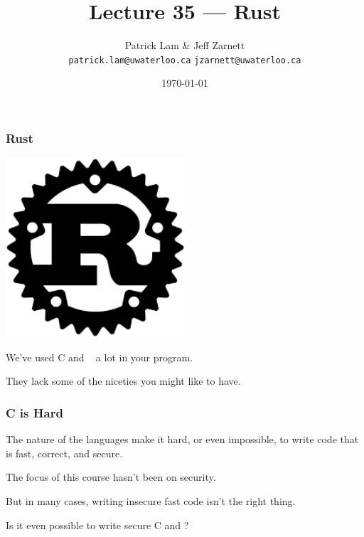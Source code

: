 

\title{Lecture 35 --- Rust }

\author{Patrick Lam \& Jeff Zarnett \\ \small \texttt{patrick.lam@uwaterloo.ca} \texttt{jzarnett@uwaterloo.ca}}
\date{\today}




\begin{frame}
  \titlepage

 \end{frame}




\begin{frame}
\frametitle{Rust}

\begin{center}
	\includegraphics[width=0.5\textwidth]{images/Rust.png}
\end{center}

We've used C and \CPP~ a lot in your program.

They lack some of the niceties you might like to have.

\end{frame}


\begin{frame}
\frametitle{C is Hard}

The nature of the languages make it hard, or even impossible, to write code that is fast, correct, and secure. 

The focus of this course hasn't been on security. 

But in many cases, writing insecure fast code isn't the right thing. 

Is it even possible to write secure C and \CPP?

\end{frame}


